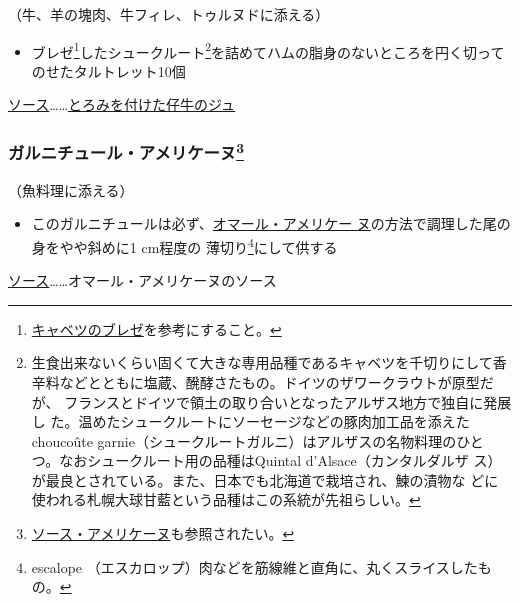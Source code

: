 \begin{recette}
（牛、羊の塊肉、牛フィレ、トゥルヌドに添える）

\begin{itemize}
\tightlist
\item
  ブレゼ\footnote{\protect\hyperlink{chou-braise}{キャベツのブレゼ}を参考にすること。}したシュークルート\footnote{生食出来ないくらい固くて大きな専用品種であるキャベツを千切りにして香
    辛料などとともに塩蔵、醗酵さたもの。ドイツのザワークラウトが原型だが、
    フランスとドイツで領土の取り合いとなったアルザス地方で独自に発展し
    た。温めたシュークルートにソーセージなどの豚肉加工品を添えた
    choucoûte garnie（シュークルートガルニ）はアルザスの名物料理のひと
    つ。なおシュークルート用の品種はQuintal d'Alsace（カンタルダルザ
    ス）が最良とされている。また、日本でも北海道で栽培され、鰊の漬物な
    どに使われる札幌大球甘藍という品種はこの系統が先祖らしい。}を詰めてハムの脂身のないところを円く切ってのせたタルトレット10個
\end{itemize}

\ul{ソース}\ldots{}\ldots{}\protect\hyperlink{jus-de-veau-lie}{とろみを付けた仔牛のジュ}

\hypertarget{garniture-americaine}{%
\subsubsection[ガルニチュール・アメリケーヌ]{\texorpdfstring{ガルニチュール・アメリケーヌ\footnote{\protect\hyperlink{sauce-americaine}{ソース・アメリケーヌ}も参照されたい。}}{ガルニチュール・アメリケーヌ}}\label{garniture-americaine}}



（魚料理に添える）

\begin{itemize}
\tightlist
\item
  このガルニチュールは必ず、\protect\hyperlink{homard-americaine}{オマール・アメリケー
  ヌ}の方法で調理した尾の身をやや斜めに1 cm程度の 薄切り\footnote{escalope
    （エスカロップ）肉などを筋線維と直角に、丸くスライスしたもの。}にして供する
\end{itemize}

\ul{ソース}\ldots{}\ldots{}オマール・アメリケーヌのソース


\end{recette}
